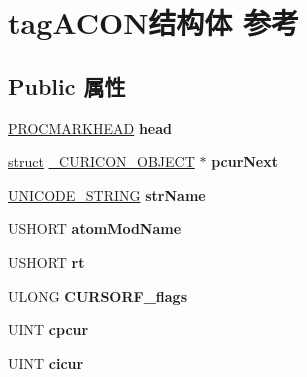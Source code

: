 \hypertarget{structtag_a_c_o_n}{}\section{tag\+A\+C\+O\+N结构体 参考}
\label{structtag_a_c_o_n}
\subsection*{Public 属性}
\begin{DoxyCompactItemize}
\item 
\mbox{\label{structtag_a_c_o_n_a5f14d50c58df3de742567c2bcdce0c58}} 
\hyperlink{struct___p_r_o_c_m_a_r_k_h_e_a_d}{P\+R\+O\+C\+M\+A\+R\+K\+H\+E\+AD} {\bfseries head}
\item 
\mbox{\label{structtag_a_c_o_n_ac0e109c7ede231f99ea27e4a811f9819}} 
\hyperlink{interfacestruct}{struct} \hyperlink{struct___c_u_r_i_c_o_n___o_b_j_e_c_t}{\+\_\+\+C\+U\+R\+I\+C\+O\+N\+\_\+\+O\+B\+J\+E\+CT} $\ast$ {\bfseries pcur\+Next}
\item 
\mbox{\label{structtag_a_c_o_n_a5c01ef530ddaf1c04fd103eecdcd8a7e}} 
\hyperlink{struct___u_n_i_c_o_d_e___s_t_r_i_n_g}{U\+N\+I\+C\+O\+D\+E\+\_\+\+S\+T\+R\+I\+NG} {\bfseries str\+Name}
\item 
\mbox{\label{structtag_a_c_o_n_aef4cf44ed28b08c77bb3508ce8565b2b}} 
U\+S\+H\+O\+RT {\bfseries atom\+Mod\+Name}
\item 
\mbox{\label{structtag_a_c_o_n_a8234e2b00262e729b4b3be3cc0425e20}} 
U\+S\+H\+O\+RT {\bfseries rt}
\item 
\mbox{\label{structtag_a_c_o_n_afcfd662cf723c32b4288caeff36f4810}} 
U\+L\+O\+NG {\bfseries C\+U\+R\+S\+O\+R\+F\+\_\+flags}
\item 
\mbox{\label{structtag_a_c_o_n_a19c042498bbbf373b9e33a3175158f1d}} 
U\+I\+NT {\bfseries cpcur}
\item 
\mbox{\label{structtag_a_c_o_n_a870ed1be7b53af7da38058b1504f23ad}} 
U\+I\+NT {\bfseries cicur}
\item 
\mbox{\label{structtag_a_c_o_n_aa7f9a0dde898c970220502d392c723e4}} 

\end{DoxyCompactItemize}
